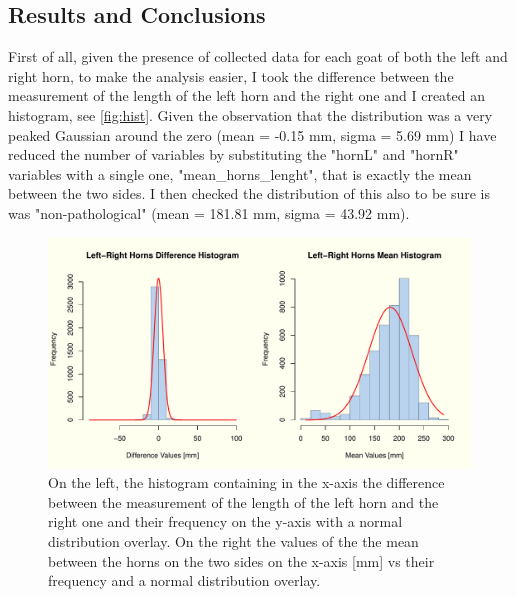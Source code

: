 \documentclass{article}
\begin{document}
\subsection{Results and Conclusions}
First of all, given the presence of collected data for each goat of both the left and right horn, to make the analysis easier, I took the difference between the measurement of the length of the left horn and the right one and I created an histogram, see  \autoref{fig:hist}. Given the observation that the distribution was a very peaked Gaussian around the zero (mean = -0.15 mm, sigma = 5.69 mm) I have reduced the number of variables by substituting the "hornL" and "hornR" variables with a single one, "mean\_horns\_lenght", that is exactly the mean between the two sides. I then checked the distribution of this also to be sure is was "non-pathological" (mean = 181.81 mm, sigma = 43.92 mm).
\begin{figure}[H]
\centering
  \includegraphics[scale=0.5]{histograms.pdf}
\caption{On the left, the histogram containing in the x-axis the difference between the measurement of the length of the left horn and the right one and their frequency on the y-axis with a normal distribution overlay. On the right the values of the the mean between the horns on the two sides on the x-axis [mm] vs their frequency and a normal distribution overlay.}
  \label{fig:hist}
\end{figure}
\end{document}
